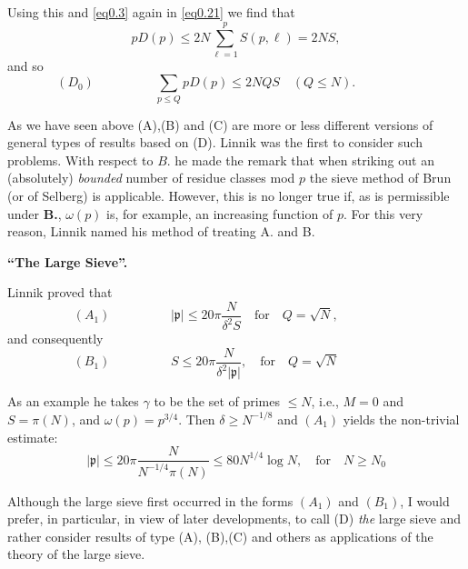 Using this and \eqref{eq0.3} again in \eqref{eq0.21} we find that 
\begin{equation*}
pD(p)\leq 2N \sum _{\ell =1}^p S(p,\ell) = 2
NS,\tag{0.23}\label{eq0.23} 
\end{equation*}
and so
\begin{equation*}
(D_0) \hspace{2cm} \sum _{p \leq Q} p D(p) \leq 2NQS \quad (Q\leq
  N). \hspace{2cm} \tag{0.24}\label{eq0.24} 
\end{equation*}

As we have seen above (A),(B) and (C) are more or less different
versions of general types of results based on (D). Linnik \cite{key1}
was the first to consider such problems. With respect to $B$. he made
the remark that when  striking out an (absolutely) \textit{bounded}
number of residue classes mod $p$ the sieve method of Brun (or  of
Selberg) is applicable. However, this is no longer true if, as is
permissible under {\bf B.}, $\omega (p)$ is,  for example, an increasing
function of $p$. For this very reason, Linnik named his method of
treating A. and B.	 

\medskip
\noindent
\textbf{``The Large Sieve''.}

Linnik\pageoriginale \cite{key1} proved that
\begin{equation*}
(A_1) \hspace{2cm} |\mathfrak{p}|\leq20 \pi \frac{N}{\delta^2 S} \quad
  \text{for}\quad Q=\sqrt{N}, \hspace{2cm} \tag{0.25}\label{eq0.25}
\end{equation*}
and consequently
\begin{equation*}
(B_1) \hspace{2cm}  S\leq 20 \pi \frac{N}{\delta^2|\mathfrak{p}|},
  \quad\text{for}\quad Q= \sqrt{N}\hspace{2cm} \tag{0.26}\label{eq0.26}
\end{equation*}

As an example he takes $\gamma$ to be the set of primes $\leq N$,
i.e., $M =0$ and  $S=\pi (N)$, and $\omega(p)= p^{3/4}$. Then $\delta
\geq N^{-1/8}$ and $(A_1)$ yields the non-trivial estimate: 
\begin{equation*}
|\mathfrak{p}| \leq 20 \pi\frac{N}{N^{-1/4}\pi (N)} \leq 80 N^{1/4}
\log N,\quad \text{for}\quad N \ge N_0\tag{0.27}\label{eq0.27} 
\end{equation*}

Although the large sieve first occurred in the forms $(A_1)$ and
$(B_1)$, I would prefer, in particular, in view of later developments,
to call (D) \textit{the} large sieve and rather consider results of
type (A), (B),(C) and others as applications of the theory of the
large sieve. 

